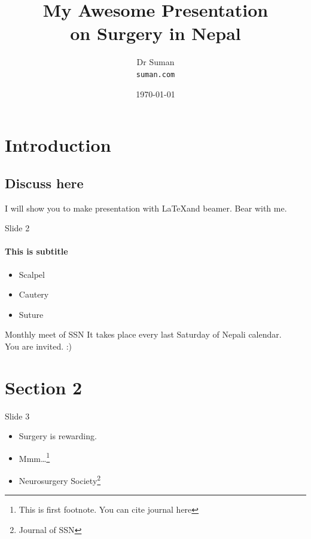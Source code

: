\documentclass[12pt]{beamer}
\title[Presentation]{My Awesome Presentation\\on Surgery in Nepal}
\author[sumandoc]{Dr Suman\\
\small \texttt{suman\dots@gmail.com}}
\date{\today}
\institute[XY University]{\normalsize Institute of Medicine, XY University}
\begin{document}
\begin{frame}
\maketitle
\end{frame}


\section{Introduction}
\subsection{Discuss here}



\begin{frame}
I will show you to make presentation with \LaTeX and beamer. Bear with me.
\end{frame}
\begin{frame}{Slide 2}
\framesubtitle{This is subtitle}
\begin{itemize}
	\item Scalpel
	\item Cautery
	\item Suture 
\end{itemize}

\begin{block}{Monthly meet of SSN}
	It takes place every last Saturday of Nepali calendar.\\You are invited. {:)}
\end{block}
\end{frame}

\section{Section 2}

\begin{frame}{Slide 3}
	\begin{itemize}
		\item {Surgery is rewarding.}
		\item Mmm\dots\footnote{This is first footnote. You can cite journal here} 
		\item Neurosurgery Society\footnote{Journal of SSN}
	\end{itemize}
\end{frame}
\end{document}
